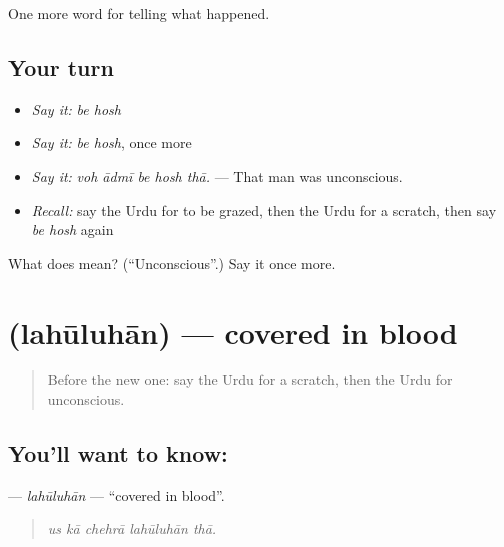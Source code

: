 \begin{grammarlens}[title={What you've built}]
One more word for telling what happened.
\end{grammarlens}

\subsection*{Your turn}
\begin{itemize}
\raggedright
  \item \emph{Say it:} \emph{be hosh}
  \item \emph{Say it:} \emph{be hosh}, once more
  \item \emph{Say it:} \emph{voh ādmī be hosh thā.} — That man was unconscious.
  \item \emph{Recall:} say the Urdu for to be grazed, then the Urdu for a scratch, then say \emph{be hosh} again
\end{itemize}

\begin{tcolorbox}[breakable,colback=teal!4,colframe=teal!35!black,title={Before you move on}]
What does   mean? (\textquotedblleft{}Unconscious\textquotedblright{}.) Say it once more.
\end{tcolorbox}
\section[\texorpdfstring{\ur{لہولہان} (lahūluhān)}{لہولہان (lahūluhān)}]{ (lahūluhān) — covered in blood}

\label{lesson:UR-C286-lahuluhan}



\begin{quote}
Before the new one: say the Urdu for a scratch, then the Urdu for unconscious.
\end{quote}

\subsection*{You'll want to know: }
\textbf{} — \emph{lahūluhān} — \textquotedblleft{}covered in blood\textquotedblright{}.

\begin{quote}
    
\end{quote}

\begin{quote}
\emph{us kā chehrā lahūluhān thā.}
\end{quote}

